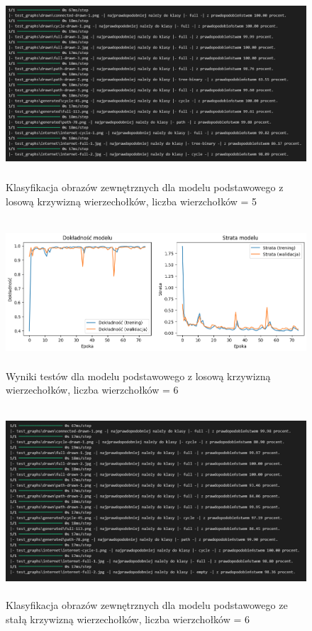 \begin{figure}[ht]
	\centering
	\includegraphics[height=7cm]{resources/tests/images/v3/base5_txt.png}
	\caption{Klasyfikacja obrazów zewnętrznych dla modelu podstawowego z losową krzywizną wierzechołków, liczba wierzchołków = 5}
	\label{Fig:tests-base-2}
\end{figure}
\FloatBarrier

\begin{figure}[ht]
	\centering
	\includegraphics[height=5.5cm]{resources/tests/images/v3/base6_img.png}
	\caption{Wyniki testów dla modelu podstawowego z losową krzywizną wierzechołków, liczba wierzchołków = 6}
	\label{Fig:tests-base-1}
\end{figure}
\FloatBarrier

\begin{figure}[ht]
	\centering
	\includegraphics[height=7cm]{resources/tests/images/v3/base6_txt.png}
	\caption{Klasyfikacja obrazów zewnętrznych dla modelu podstawowego ze stałą krzywizną wierzechołków, liczba wierzchołków = 6}
	\label{Fig:tests-base-2}
\end{figure}
\FloatBarrier

